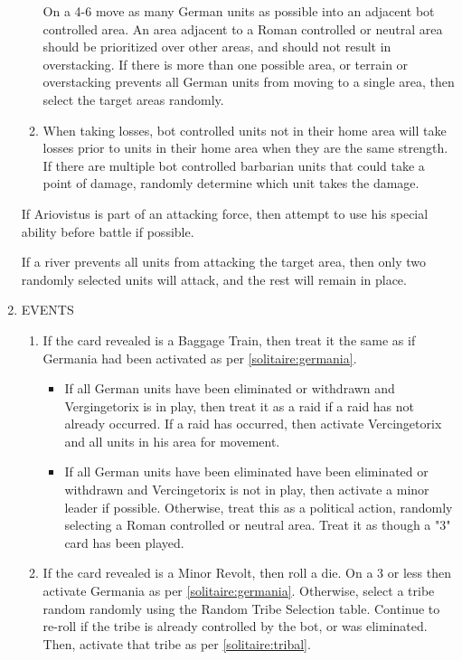 \begin{enumerate}
\begin{enumerate}[leftmargin=0in]
    On a 4-6 move as many German units as possible into an adjacent bot controlled area. An area adjacent to a Roman controlled or neutral area should be prioritized over other areas, and should not result in overstacking. If there is more than one possible area, or terrain or overstacking prevents all German units from moving to a single area, then select the target areas randomly.
    
    \item When taking losses, bot controlled units not in their home area will take losses prior to units in their home area when they are the same strength. If there are multiple bot controlled barbarian units that could take a point of damage, randomly determine which unit takes the damage.
  \end{enumerate}
  
  If Ariovistus is part of an attacking force, then attempt to use his special ability before battle if possible.

  If a river prevents all units from attacking the target area, then only two randomly selected units will attack, and the rest will remain in place.

  \item EVENTS
  
  \begin{enumerate}[leftmargin=0in]
    \item If the card revealed is a Baggage Train, then treat it the same as if Germania had been activated as per \ref{solitaire:germania}.
    
    \begin{itemize}
    \item If all German units have been eliminated or withdrawn and Vergingetorix is in play, then treat it as a raid if a raid has not already occurred. If a raid has occurred, then activate Vercingetorix and all units in his area for movement.
    
    \item If all German units have been eliminated have been eliminated or withdrawn and Vercingetorix is not in play, then activate a minor leader if possible. Otherwise, treat this as a political action, randomly selecting a Roman controlled or neutral area. Treat it as though a "3" card has been played.
    \end{itemize}
    
    \item If the card revealed is a Minor Revolt, then roll a die. On a 3 or less then activate Germania as per \ref{solitaire:germania}. Otherwise, select a tribe random randomly using the Random Tribe Selection table. Continue to re-roll if the tribe is already controlled by the bot, or was eliminated. Then, activate that tribe as per \ref{solitaire:tribal}.
  

\end{enumerate}
\end{enumerate}
